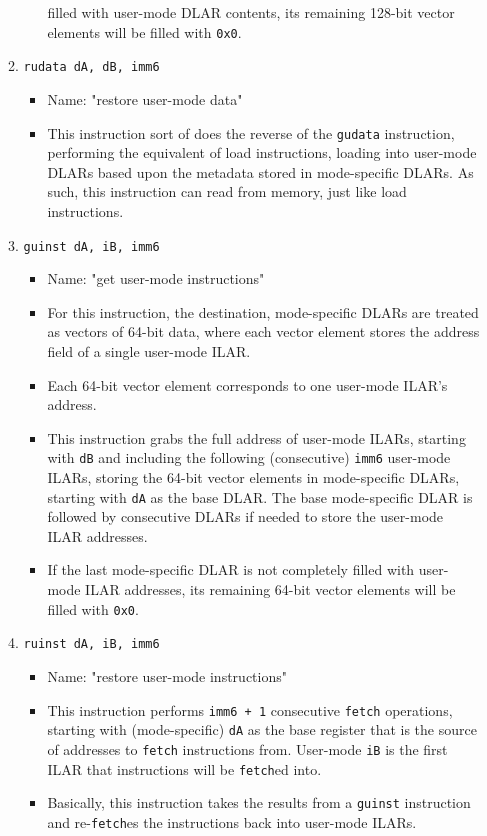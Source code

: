 \documentclass{article}
\begin{document}
\begin{itemize}
\begin{enumerate}
\begin{itemize}
					filled with user-mode DLAR contents, its remaining
					128-bit vector elements will be filled with
					\texttt{0x0}.
				\end{itemize}
			\item \texttt{rudata dA, dB, imm6}
				\begin{itemize}
				\item Name:  "restore user-mode data"
				\item This instruction sort of does the reverse of the
					\texttt{gudata} instruction, performing the equivalent
					of load instructions, loading into user-mode DLARs
					based upon the metadata stored in mode-specific DLARs.
					As such, this instruction can read from memory, just
					like load instructions.
				\end{itemize}

			\item \texttt{guinst dA, iB, imm6}
				\begin{itemize}
				\item Name:  "get user-mode instructions"
				\item For this instruction, the destination, mode-specific
					DLARs are treated as vectors of 64-bit data, where each
					vector element stores the address field of a single
					user-mode ILAR.
				\item Each 64-bit vector element corresponds to one
					user-mode ILAR's address.
				\item This instruction grabs the full address of user-mode
					ILARs, starting with \texttt{dB} and including the
					following (consecutive) \texttt{imm6} user-mode ILARs,
					storing the 64-bit vector elements in mode-specific
					DLARs, starting with \texttt{dA} as the base DLAR.  The
					base mode-specific DLAR is followed by consecutive
					DLARs if needed to store the user-mode ILAR addresses.
				\item If the last mode-specific DLAR is not completely
					filled with user-mode ILAR addresses, its remaining
					64-bit vector elements will be filled with
					\texttt{0x0}.
				\end{itemize}
			\item \texttt{ruinst dA, iB, imm6}
				\begin{itemize}
				\item Name:  "restore user-mode instructions"
				\item This instruction performs \texttt{imm6 + 1}
					consecutive \texttt{fetch} operations, starting with
					(mode-specific) \texttt{dA} as the base register that
					is the source of addresses to \texttt{fetch}
					instructions from.  User-mode \texttt{iB} is the first
					ILAR that instructions will be \texttt{fetch}ed into.
				\item Basically, this instruction takes the results from
					a \texttt{guinst} instruction and re-\texttt{fetch}es
					the instructions back into user-mode ILARs.
				\end{itemize}


\end{enumerate}
\end{itemize}
\end{document}
